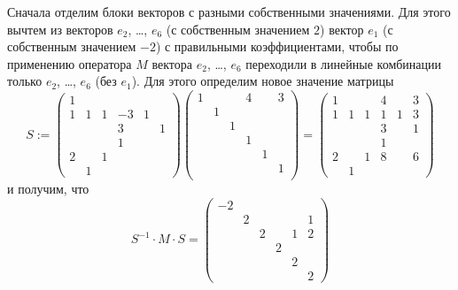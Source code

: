 \documentclass[12pt,a4paper]{article}
\begin{document}
\begin{problem*}
        Сначала отделим блоки векторов с разными собственными значениями. Для этого вычтем из векторов $e_2$, \dots, $e_6$ (с собственным значением $2$) вектор $e_1$ (с собственным значением $-2$) с правильными коэффициентами, чтобы по применению оператора $M$ вектора $e_2$, \dots, $e_6$ переходили в линейные комбинации только $e_2$, \dots, $e_6$ (без $e_1$). Для этого определим новое значение матрицы
        \[
            S :=
            \begin{pmatrix}
                1&&&&&\\
                1& 1& 1& -3&1&\\
                &&& 3&&1\\
                &&& 1&&\\
                2&&1&&&\\
                &1&&&&
            \end{pmatrix}
            \begin{pmatrix}
                1&&&4&&3\\
                &1&&&&\\
                &&1&&&\\
                &&&1&&\\
                &&&&1&\\
                &&&&&1\\
            \end{pmatrix}
            =
            \begin{pmatrix}
                1&&& 4&& 3\\
                1& 1& 1& 1& 1& 3\\
                &&& 3&& 1\\
                &&& 1&&\\
                2&& 1& 8&& 6\\
                & 1&&&& 
            \end{pmatrix}
        \]
        и получим, что
        \[
            S^{-1} \cdot M \cdot S =
            \begin{pmatrix}
                -2&&&&&\\
                &2&&&&1\\
                &&2&&1&2\\
                &&&2&&\\
                &&&&2&\\
                &&&&&2 
            \end{pmatrix}
        \]


\end{problem*}
\end{document}
